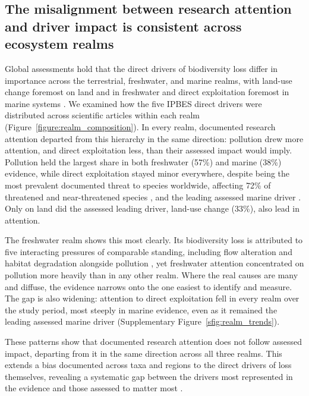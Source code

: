 \documentclass[12pt]{article}
\begin{document}
\subsection*{The misalignment between research attention and driver impact is consistent across ecosystem realms}

Global assessments hold that the direct drivers of biodiversity loss differ in importance across the terrestrial, freshwater, and marine realms, with land-use change foremost on land and in freshwater and direct exploitation foremost in marine systems \cite{jaureguiberry_direct_2022, spm_nxs_ipbes_2024}. We examined how the five IPBES direct drivers were distributed across scientific articles within each realm (Figure~\ref{figure:realm_composition}). In every realm, documented research attention departed from this hierarchy in the same direction: pollution drew more attention, and direct exploitation less, than their assessed impact would imply. Pollution held the largest share in both freshwater (57\%) and marine (38\%) evidence, while direct exploitation stayed minor everywhere, despite being the most prevalent documented threat to species worldwide, affecting 72\% of threatened and near-threatened species \cite{maxwell_biodiversity_2016}, and the leading assessed marine driver \cite{spm_nxs_ipbes_2024}. Only on land did the assessed leading driver, land-use change (33\%), also lead in attention.

The freshwater realm shows this most clearly. Its biodiversity loss is attributed to five interacting pressures of comparable standing, including flow alteration and habitat degradation alongside pollution \cite{Reid_freshwater}, yet freshwater attention concentrated on pollution more heavily than in any other realm. Where the real causes are many and diffuse, the evidence narrows onto the one easiest to identify and measure. The gap is also widening: attention to direct exploitation fell in every realm over the study period, most steeply in marine evidence, even as it remained the leading assessed marine driver (Supplementary Figure~\ref{sfig:realm_trends}).

These patterns show that documented research attention does not follow assessed impact, departing from it in the same direction across all three realms. This extends a bias documented across taxa and regions \cite{titley_scientific_2017, troudet2017taxonomic} to the direct drivers of loss themselves, revealing a systematic gap between the drivers most represented in the evidence and those assessed to matter most \cite{diaz_ipbes_2015}.
\end{document}

